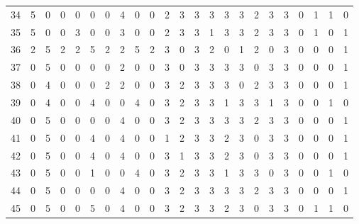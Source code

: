\begin{table}[htbp]
{\begin{tabular}{lllllllllllllllllllllll}
34                  & 5 & 0 & 0 & 0 & 0 & 0 & 4 & 0 & 0 & 2 & 3 & 3 & 3 & 3 & 3 & 2 & 3 & 3 & 0                  & 1                   & 1                   & 0                   \\
35                  & 5 & 0 & 0 & 3 & 0 & 0 & 3 & 0 & 0 & 2 & 3 & 3 & 1 & 3 & 3 & 2 & 3 & 3 & 0                  & 1                   & 0                   & 1                   \\
36                  & 2 & 5 & 2 & 2 & 5 & 2 & 2 & 5 & 2 & 3 & 0 & 3 & 2 & 0 & 1 & 2 & 0 & 3 & 0                  & 0                   & 0                   & 1                   \\
37                  & 0 & 5 & 0 & 0 & 0 & 0 & 2 & 0 & 0 & 3 & 0 & 3 & 3 & 3 & 3 & 0 & 3 & 3 & 0                  & 0                   & 0                   & 1                   \\
38                  & 0 & 4 & 0 & 0 & 0 & 2 & 2 & 0 & 0 & 3 & 2 & 3 & 3 & 3 & 0 & 2 & 3 & 3 & 0                  & 0                   & 0                   & 1                   \\
39                  & 0 & 4 & 0 & 0 & 4 & 0 & 0 & 4 & 0 & 3 & 2 & 3 & 3 & 1 & 3 & 3 & 1 & 3 & 0                  & 0                   & 1                   & 0                   \\
40                  & 0 & 5 & 0 & 0 & 0 & 0 & 4 & 0 & 0 & 3 & 2 & 3 & 3 & 3 & 3 & 2 & 3 & 3 & 0                  & 0                   & 0                   & 1                   \\
41                  & 0 & 5 & 0 & 0 & 4 & 0 & 4 & 0 & 0 & 1 & 2 & 3 & 3 & 2 & 3 & 0 & 3 & 3 & 0                  & 0                   & 0                   & 1                   \\
42                  & 0 & 5 & 0 & 0 & 4 & 0 & 4 & 0 & 0 & 3 & 1 & 3 & 3 & 2 & 3 & 0 & 3 & 3 & 0                  & 0                   & 0                   & 1                   \\
43                  & 0 & 5 & 0 & 0 & 1 & 0 & 0 & 4 & 0 & 3 & 2 & 3 & 3 & 1 & 3 & 3 & 0 & 3 & 0                  & 0                   & 1                   &     0                \\
44                  & 0 & 5 & 0 & 0 & 0 & 0 & 4 & 0 & 0 & 3 & 2 & 3 & 3 & 3 & 3 & 2 & 3 & 3 & 0                  & 0                   & 0                   & 1                   \\
45                  & 0 & 5 & 0 & 0 & 5 & 0 & 4 & 0 & 0 & 3 & 2 & 3 & 3 & 2 & 3 & 0 & 3 & 3 & 0                  & 1                   & 1                   &   0                  \\

\end{tabular}}
\end{table}
